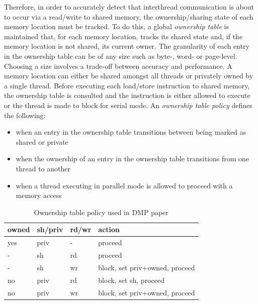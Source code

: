 Therefore, in order to accurately detect that interthread
communication is about to occur via a read/write to shared memory, the
ownership/sharing state of each memory location must be tracked.  To
do this, a global \emph{ownership table} is maintained that, for each
memory location, tracks its shared state and, if the memory location
is not shared, its current owner.  The granularity of each entry in
the ownership table can be of any size such as byte-, word- or
page-level.  Choosing a size involves a trade-off between accuracy and
performance.  A memory location can either be shared amongst all
threads or privately owned by a single thread.  Before executing each
load/store instruction to shared memory, the ownership table is
consulted and the instruction is either allowed to execute or the
thread is made to block for serial mode.  An \emph{ownership table
  policy} defines the following:

\begin{itemize}
\item when an entry in the ownership table transitions between being
  marked as shared or private

\item when the ownership of an entry in the ownership table
  transitions from one thread to another

\item when a thread executing in parallel mode is allowed to proceed
  with a memory access
\end{itemize}

\begin{table}
  \begin{tabular}{l|l|l|l}
    owned  &  sh/priv  &  rd/wr    &  action                         \\
    \hline
    yes    &  priv     &  -        &  proceed                        \\
    -      &  sh       &  rd       &  proceed                        \\
    -      &  sh       &  wr       &  block, set priv+owned, proceed \\
    no     &  priv     &  rd       &  block, set sh, proceed         \\
    no     &  priv     &  wr       &  block, set priv+owned, proceed \\
  \end{tabular}
  \caption{Ownership table policy used in DMP paper}
  \label{table:ownership-policy}
\end{table}

